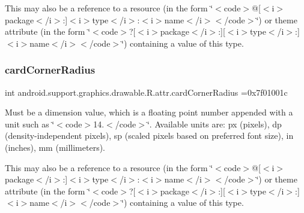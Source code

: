 This may also be a reference to a resource (in the form \char`\"{}$<$code$>$@\mbox{[}$<$i$>$package$<$/i$>$\+:\mbox{]}$<$i$>$type$<$/i$>$\+:$<$i$>$name$<$/i$>$$<$/code$>$\char`\"{}) or theme attribute (in the form \char`\"{}$<$code$>$?\mbox{[}$<$i$>$package$<$/i$>$\+:\mbox{]}\mbox{[}$<$i$>$type$<$/i$>$\+:\mbox{]}$<$i$>$name$<$/i$>$$<$/code$>$\char`\"{}) containing a value of this type. \mbox{\label{classandroid_1_1support_1_1graphics_1_1drawable_1_1R_1_1attr_a0845abda5f33cbe27e36f5faa30c0972}} 
\subsubsection{\texorpdfstring{card\+Corner\+Radius}{cardCornerRadius}}
{\footnotesize\ttfamily int android.\+support.\+graphics.\+drawable.\+R.\+attr.\+card\+Corner\+Radius =0x7f01001c\hspace{0.3cm}{\ttfamily [static]}}

Must be a dimension value, which is a floating point number appended with a unit such as \char`\"{}$<$code$>$14.\+5sp$<$/code$>$\char`\"{}. Available units are\+: px (pixels), dp (density-\/independent pixels), sp (scaled pixels based on preferred font size), in (inches), mm (millimeters). 

This may also be a reference to a resource (in the form \char`\"{}$<$code$>$@\mbox{[}$<$i$>$package$<$/i$>$\+:\mbox{]}$<$i$>$type$<$/i$>$\+:$<$i$>$name$<$/i$>$$<$/code$>$\char`\"{}) or theme attribute (in the form \char`\"{}$<$code$>$?\mbox{[}$<$i$>$package$<$/i$>$\+:\mbox{]}\mbox{[}$<$i$>$type$<$/i$>$\+:\mbox{]}$<$i$>$name$<$/i$>$$<$/code$>$\char`\"{}) containing a value of this type. \mbox{\label{classandroid_1_1support_1_1graphics_1_1drawable_1_1R_1_1attr_a286106e5c8b86045d205db201bfe4620}} 
